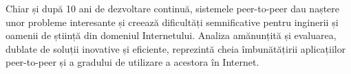 Chiar și după 10 ani de dezvoltare continuă, sistemele peer-to-peer dau naștere
unor probleme interesante și creează dificultăți semnificative pentru
inginerii și oamenii de știință din domeniul Internetului. Analiza
amănunțită și evaluarea, dublate de soluții inovative și eficiente, reprezintă
cheia îmbunătățirii aplicațiilor peer-to-peer și a gradului de utilizare
a acestora în Internet.
